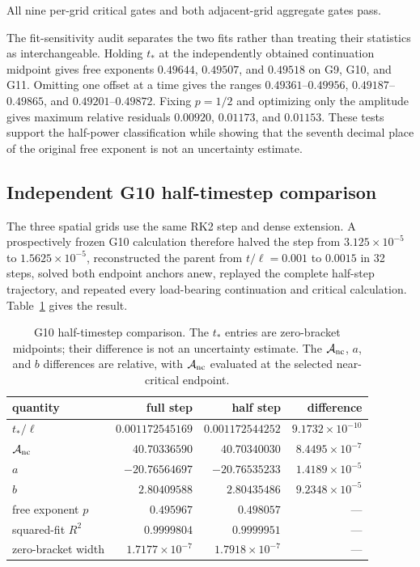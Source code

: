 \documentclass[11pt]{article}
\begin{document}
All nine per-grid critical gates and both adjacent-grid aggregate gates pass.

The fit-sensitivity audit separates the two fits rather than treating their
statistics as interchangeable.  Holding $t_*$ at the independently obtained
continuation midpoint gives free exponents $0.49644$, $0.49507$, and
$0.49518$ on G9, G10, and G11.  Omitting one offset at a time gives the ranges
$0.49361$--$0.49956$, $0.49187$--$0.49865$, and
$0.49201$--$0.49872$.  Fixing $p=1/2$ and optimizing only the amplitude gives
maximum relative residuals $0.00920$, $0.01173$, and $0.01153$.  These tests
support the half-power classification while showing that the seventh decimal
place of the original free exponent is not an uncertainty estimate.

\subsection{Independent G10 half-timestep comparison}

The three spatial grids use the same RK2 step and dense extension.  A
prospectively frozen G10 calculation therefore halved the step from
$3.125\times10^{-5}$ to $1.5625\times10^{-5}$, reconstructed the parent from
$t/\ell=0.001$ to $0.0015$ in 32 steps, solved both endpoint anchors anew,
replayed the complete half-step trajectory, and repeated every load-bearing
continuation and critical calculation.  Table~\ref{tab:supp-temporal} gives
the result.

\begin{table}[ht]
\centering
\caption{G10 half-timestep comparison.  The $t_*$ entries are zero-bracket
midpoints; their difference is not an uncertainty estimate.  The
$\mathcal A_{\rm nc}$, $a$, and $b$ differences are relative, with
$\mathcal A_{\rm nc}$ evaluated at the selected near-critical endpoint.}
\label{tab:supp-temporal}
\begin{tabular}{@{}lrrr@{}}
\toprule
quantity & full step & half step & difference \\
\midrule
$t_*/\ell$ & $0.001172545169$ & $0.001172544252$ & $9.1732\times10^{-10}$ \\
$\mathcal A_{\rm nc}$ & $40.70336590$ & $40.70340030$ & $8.4495\times10^{-7}$ \\
$a$ & $-20.76564697$ & $-20.76535233$ & $1.4189\times10^{-5}$ \\
$b$ & $2.80409588$ & $2.80435486$ & $9.2348\times10^{-5}$ \\
free exponent $p$ & $0.495967$ & $0.498057$ & --- \\
squared-fit $R^2$ & $0.9999804$ & $0.9999951$ & --- \\
zero-bracket width & $1.7177\times10^{-7}$ & $1.7918\times10^{-7}$ & --- \\
\bottomrule
\end{tabular}
\end{table}
\end{document}
